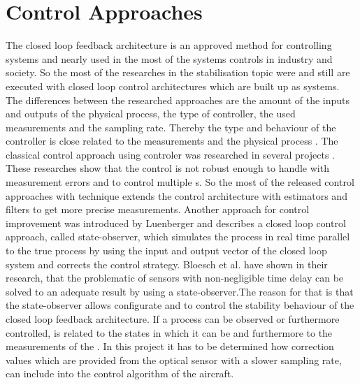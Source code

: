 \newpage
\section{Control Approaches}

The closed loop feedback architecture is an approved method for controlling
systems and nearly used in the most of the systems controls in industry and
society. So the most of the researches in the \UAV stabilisation topic were
and still are executed with closed loop control architectures which are built up as
\MIMO systems. The differences between the researched approaches are the
amount of the inputs and outputs of the physical process, the type of controller,
the used measurements and the sampling rate. Thereby the type and behaviour of
the controller is close related to the measurements and the physical process
.
 The classical control approach using \PID controler was
researched in several \HUAV projects 
. These researches show that the \PID control is not
robust enough to handle with measurement errors and to control multiple \DOF s. So the most of
the released control approaches with \PID technique extends the control architecture
with estimators and filters to get more precise measurements. Another
approach for control improvement was introduced by Luenberger  and
describes a closed loop control approach, called state-observer, which simulates
the process in real time parallel to the true process by using the input and
output vector of the closed loop system and corrects the control strategy.
Bloesch et al.  have shown in their research,
that the problematic of sensors with non-negligible time delay can be solved to an
adequate result by using a state-observer.\newpage The reason for that is that
the state-observer allows configurate and to control the stability behaviour of the
closed loop feedback architecture. If a process can be observed or furthermore
controlled, is related to the states in which it can be and furthermore to
 the measurements of the \DOF 
 . In this
 project it has to be determined how correction values which are provided
 from the optical sensor with a slower sampling rate, can include into the
 control algorithm of the aircraft.


